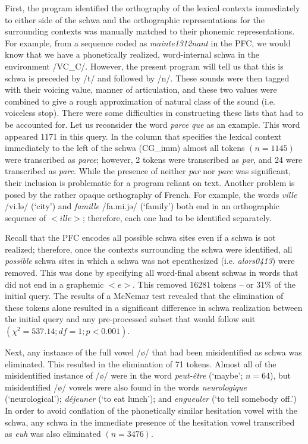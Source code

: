 \documentclass[output=paper,colorlinks,citecolor=brown,
]{langscibook}
\begin{document}
First, the program identified the orthography of the lexical contexts immediately to either side of the schwa and the orthographic representations for the surrounding contexts was manually matched to their phonemic representations. For example, from a sequence coded as \textit{mainte1312nant} in the PFC, we would know that we have a phonetically realized, word-internal schwa in the environment /VC\_C/. However, the present program will tell us that this is schwa is preceded by /t/ and followed by /n/. These sounds were then tagged with their voicing value, manner of articulation, and these two values were combined to give a rough approximation of natural class of the sound (i.e. voiceless stop). There were some difficulties in constructing these lists that had to be accounted for. Let us reconsider the word \textit{parce que} as an example. This word appeared 1171 in this query. In the column that specifies the lexical context immediately to the left of the schwa (CG\_imm) almost all tokens $(n=1145)$ were transcribed as \textit{parce}; however, 2 tokens were transcribed as \textit{par}, and 24 were transcribed as \textit{parc}. While the presence of neither \textit{par} nor \textit{parc} was significant, their inclusion is problematic for a program reliant on text. Another problem is posed by the rather opaque orthography of French.  For example, the words \textit{ville} /vi.lə/ (`city') and \textit{famille} /fa.mi.jə/ (`family') both end in an orthographic sequence of $<ille>$; therefore, each one had to be identified separately.

Recall that the PFC encodes all possible schwa sites even if a schwa is not realized; therefore, once the contexts surrounding the schwa were identified, all \textit{possible} schwa sites in which a schwa was not epenthesized (i.e. \textit{alors0413}) were removed. This was done by specifying all word-final absent schwas in words that did not end in a graphemic $<e>$. This removed 16281 tokens -- or 31\% of the initial query. The results of a McNemar test revealed that the elimination of these tokens alone resulted in a significant difference in schwa realization between the initial query and any pre-processed subset that would follow suit $(\chi^2=537.14;df=1;p<0.001)$.

Next, any instance of the full vowel /ø/ that had been misidentified as schwa was eliminated. This resulted in the elimination of 71 tokens. Almost all of the misidentified instance of /ø/ were in the word \textit{peut-\^etre} (`maybe'; $n=64$), but misidentified /ø/ vowels were also found in the words \textit{neurologique} (`neurological'); \textit{d\'ejeuner} (`to eat lunch'); and \textit{engueuler} (`to tell somebody off.') In order to avoid conflation of the phonetically similar hesitation vowel with the schwa, any schwa in the immediate presence of the hesitation vowel transcribed as \textit{euh} was also eliminated $(n=3476)$.
\end{document}
